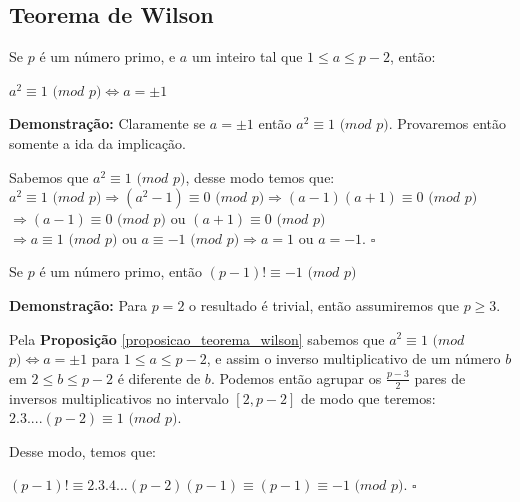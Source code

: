 \subsection{Teorema de Wilson}

\begin{proposition}\label{proposicao_teorema_wilson}
Se $p$ é um número primo, e $a$ um inteiro tal que $1\leq a\leq p-2$, então:

$a^2 \equiv 1$ $(mod$ $p) \Leftrightarrow a = \pm 1 $
\end{proposition}
\textbf{Demonstração:}
Claramente se $a = \pm 1$ então $a^2 \equiv 1$ $(mod$ $p)$. Provaremos então somente a ida da implicação.

Sabemos que $a^2 \equiv 1$ $(mod$ $p)$, desse modo temos que:
\\

$a^2 \equiv 1$ $(mod$ $p) \Rightarrow (a^2-1) \equiv 0$ $(mod$ $p) \Rightarrow (a-1)(a+1) \equiv 0$ $(mod$ $p)$
\\
$\Rightarrow (a-1)\equiv0$ $(mod$ $p)$ ou $(a+1)\equiv0$ $(mod$ $p)$
\\
$\Rightarrow a\equiv1$ $(mod$ $p)$ ou $a\equiv-1$ $(mod$ $p) \Rightarrow a=1$ ou $a=-1$. $\square$

\begin{theorem}
Se $p$ é um número primo, então $(p-1)! \equiv -1$ $(mod$ $p)$
\end{theorem}
\textbf{Demonstração:}
Para $p=2$ o resultado é trivial, então assumiremos que $p\geq 3$.

Pela \textbf{Proposição} \autoref{proposicao_teorema_wilson} sabemos que $a^2 \equiv 1$ $(mod$ $p) \Leftrightarrow a = \pm 1$ 
para $1\leq a\leq p-2$, e assim o inverso multiplicativo de um número $b$ em $2\leq b\leq p-2$ é diferente de $b$. Podemos então
agrupar os $\frac{p-3}{2}$ pares de inversos multiplicativos no intervalo $[2,p-2]$ de modo que teremos: $2.3....(p-2) \equiv1$ $(mod$ $p)$.

Desse modo, temos que:

$(p-1)! \equiv 2.3.4...(p-2)(p-1) \equiv (p-1) \equiv -1$ $(mod$ $p)$. $\square$




